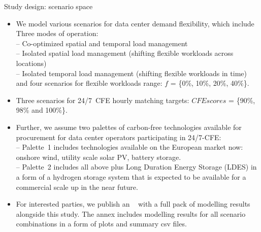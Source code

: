 \begin{frame}{Study design: scenario space}

  {\footnotesize 
  \begin{itemize}

  \item We model various scenarios for data center demand flexibility, which include \\
  \vspace{0.1cm}
  Three modes of operation: \\
    -- \alert{Co-optimized spatial and temporal} load management \\
    -- \alert{Isolated spatial} load management (shifting flexible workloads across locations)\\ 
    -- \alert{Isolated temporal} load management (shifting flexible workloads in time) \\ 
  \vspace{0.1cm}
  and four scenarios for flexible workloads range: \alert{$f$ = \{0\%, 10\%, 20\%, 40\%\}}.

  \item Three scenarios for 24/7~CFE hourly matching targets:
  \alert{$CFE scores$ = \{90\%, 98\% and 100\%\}}.
  
  \item Further, we assume two palettes of carbon-free technologies available for procurement for data center operators participating in 24/7-CFE: \\
  \vspace{0.1cm}
  -- \alert{Palette~1} includes technologies available on the European market now: onshore wind, utility scale solar PV, battery storage. \\
  -- \alert{Palette~2} includes all above plus Long Duration Energy Storage (LDES) in a form of a hydrogen storage system that is expected to be available for a commercial scale up in the near future. 

  \item For interested parties, we publish an \faLink~ with a full pack of modelling results alongside this study. The annex includes modelling results for all scenario combinations in a form of plots and summary csv files. 

  \end{itemize}
  }
\end{frame}




